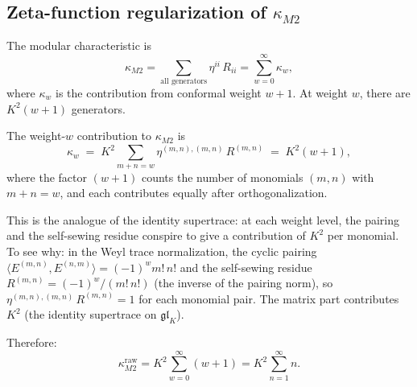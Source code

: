 \documentclass[11pt]{article}
\begin{document}
\subsection{Zeta-function regularization of $\kappa_{M2}$}

The modular characteristic is
\[
\kappa_{M2}
= \sum_{\text{all generators}} \eta^{ii}\, R_{ii}
= \sum_{w=0}^{\infty} \kappa_w,
\]
where $\kappa_w$ is the contribution from conformal weight $w+1$.
At weight $w$, there are $K^2(w+1)$ generators.

\begin{theorem}
\label{thm:kappa-m2-weight}
The weight-$w$ contribution to $\kappa_{M2}$ is
\begin{equation}\label{eq:kappa-m2-weight-w}
\kappa_w
\;=\;
K^2 \sum_{m+n=w} \eta^{(m,n),(m,n)}\, R^{(m,n)}
\;=\;
K^2 (w+1),
\end{equation}
where the factor $(w+1)$ counts the number of monomials
$(m,n)$ with $m+n = w$, and each contributes equally after
orthogonalization.

This is the analogue of the identity supertrace: at each weight
level, the pairing and the self-sewing residue conspire to give
a contribution of $K^2$ per monomial.  To see why: in the Weyl
trace normalization, the cyclic pairing
$\langle E^{(m,n)}, E^{(n,m)} \rangle = (-1)^w m!\, n!$ and the
self-sewing residue $R^{(m,n)} = (-1)^w / (m!\, n!)$
(the inverse of the pairing norm), so
$\eta^{(m,n),(m,n)}\, R^{(m,n)} = 1$ for each monomial pair.
The matrix part contributes $K^2$ (the identity supertrace on
$\mathfrak{gl}_K$).

Therefore:
\begin{equation}\label{eq:kappa-m2-raw}
\kappa_{M2}^{\mathrm{raw}}
= K^2 \sum_{w=0}^{\infty} (w+1)
= K^2 \sum_{n=1}^{\infty} n.
\end{equation}
\end{theorem}
\end{document}
